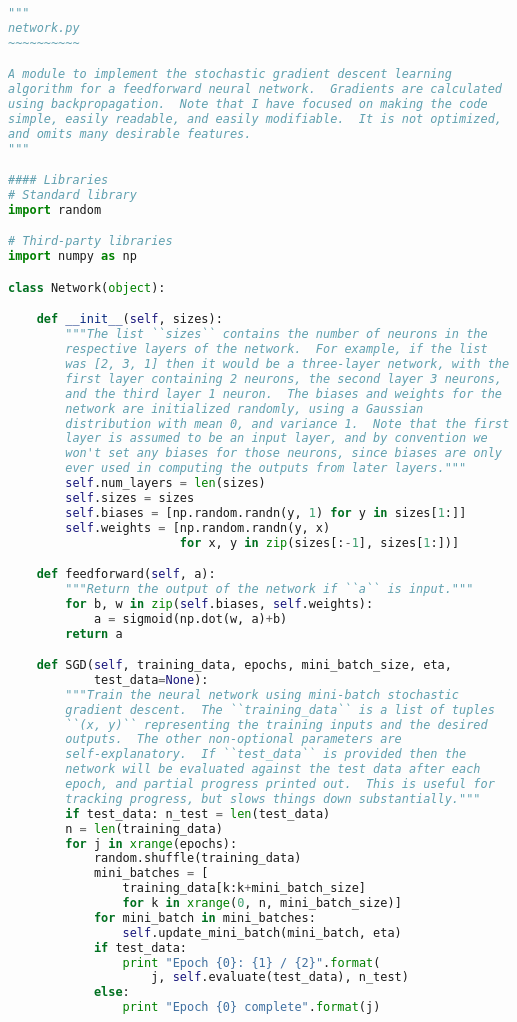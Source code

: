 \begin{fullwidth}
\begin{lstlisting}[caption={network.py (Python 2.7)},label={lst:network.py}, language=Python]
"""
network.py
~~~~~~~~~~

A module to implement the stochastic gradient descent learning
algorithm for a feedforward neural network.  Gradients are calculated
using backpropagation.  Note that I have focused on making the code
simple, easily readable, and easily modifiable.  It is not optimized,
and omits many desirable features.
"""

#### Libraries
# Standard library
import random

# Third-party libraries
import numpy as np

class Network(object):

    def __init__(self, sizes):
        """The list ``sizes`` contains the number of neurons in the
        respective layers of the network.  For example, if the list
        was [2, 3, 1] then it would be a three-layer network, with the
        first layer containing 2 neurons, the second layer 3 neurons,
        and the third layer 1 neuron.  The biases and weights for the
        network are initialized randomly, using a Gaussian
        distribution with mean 0, and variance 1.  Note that the first
        layer is assumed to be an input layer, and by convention we
        won't set any biases for those neurons, since biases are only
        ever used in computing the outputs from later layers."""
        self.num_layers = len(sizes)
        self.sizes = sizes
        self.biases = [np.random.randn(y, 1) for y in sizes[1:]]
        self.weights = [np.random.randn(y, x)
                        for x, y in zip(sizes[:-1], sizes[1:])]

    def feedforward(self, a):
        """Return the output of the network if ``a`` is input."""
        for b, w in zip(self.biases, self.weights):
            a = sigmoid(np.dot(w, a)+b)
        return a

    def SGD(self, training_data, epochs, mini_batch_size, eta,
            test_data=None):
        """Train the neural network using mini-batch stochastic
        gradient descent.  The ``training_data`` is a list of tuples
        ``(x, y)`` representing the training inputs and the desired
        outputs.  The other non-optional parameters are
        self-explanatory.  If ``test_data`` is provided then the
        network will be evaluated against the test data after each
        epoch, and partial progress printed out.  This is useful for
        tracking progress, but slows things down substantially."""
        if test_data: n_test = len(test_data)
        n = len(training_data)
        for j in xrange(epochs):
            random.shuffle(training_data)
            mini_batches = [
                training_data[k:k+mini_batch_size]
                for k in xrange(0, n, mini_batch_size)]
            for mini_batch in mini_batches:
                self.update_mini_batch(mini_batch, eta)
            if test_data:
                print "Epoch {0}: {1} / {2}".format(
                    j, self.evaluate(test_data), n_test)
            else:
                print "Epoch {0} complete".format(j)


\end{lstlisting}
\end{fullwidth}
